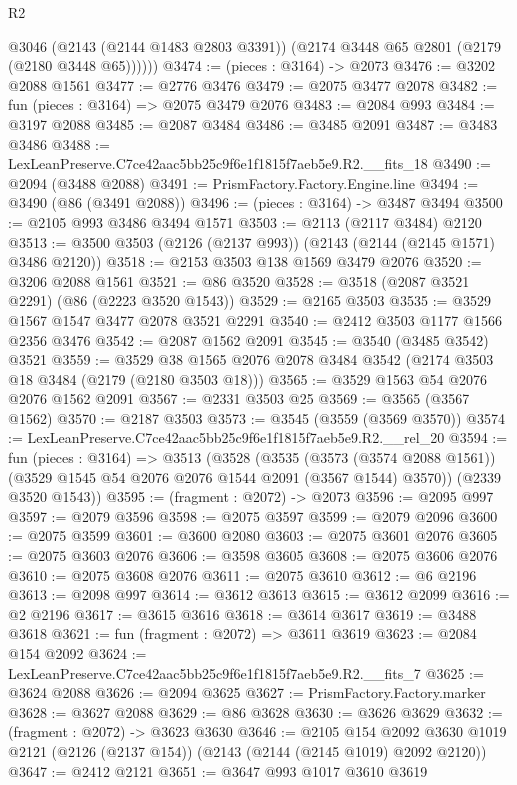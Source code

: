 \begin{lexlean}{R2}
\begin{coremodule}
          @3046
          (@2143 (@2144 @1483 @2803 @3391))
          (@2174 @3448 @65 @2801 (@2179 (@2180 @3448 @65))))))
@3474 := (pieces : @3164) -> @2073
@3476 := @3202 @2088 @1561
@3477 := @2776 @3476
@3479 := @2075 @3477 @2078
@3482 := fun (pieces : @3164) => @2075 @3479 @2076
@3483 := @2084 @993
@3484 := @3197 @2088
@3485 := @2087 @3484
@3486 := @3485 @2091
@3487 := @3483 @3486
@3488 := LexLeanPreserve.C7ce42aac5bb25c9f6e1f1815f7aeb5e9.R2.__fits_18
@3490 := @2094 (@3488 @2088)
@3491 := PrismFactory.Factory.Engine.line
@3494 := @3490 (@86 (@3491 @2088))
@3496 := (pieces : @3164) -> @3487 @3494
@3500 := @2105 @993 @3486 @3494 @1571
@3503 := @2113 (@2117 @3484) @2120
@3513 := @3500 @3503 (@2126 (@2137 @993)) (@2143 (@2144 (@2145 @1571) @3486 @2120))
@3518 := @2153 @3503 @138 @1569 @3479 @2076
@3520 := @3206 @2088 @1561
@3521 := @86 @3520
@3528 := @3518 (@2087 @3521 @2291) (@86 (@2223 @3520 @1543))
@3529 := @2165 @3503
@3535 := @3529 @1567 @1547 @3477 @2078 @3521 @2291
@3540 := @2412 @3503 @1177 @1566 @2356 @3476
@3542 := @2087 @1562 @2091
@3545 := @3540 (@3485 @3542) @3521
@3559 := @3529 @38 @1565 @2076 @2078 @3484 @3542 (@2174 @3503 @18 @3484 (@2179 (@2180 @3503 @18)))
@3565 := @3529 @1563 @54 @2076 @2076 @1562 @2091
@3567 := @2331 @3503 @25
@3569 := @3565 (@3567 @1562)
@3570 := @2187 @3503
@3573 := @3545 (@3559 (@3569 @3570))
@3574 := LexLeanPreserve.C7ce42aac5bb25c9f6e1f1815f7aeb5e9.R2.__rel_20
@3594 := fun (pieces : @3164) =>
  @3513
    (@3528
      (@3535
        (@3573 (@3574 @2088 @1561))
        (@3529 @1545 @54 @2076 @2076 @1544 @2091 (@3567 @1544) @3570))
      (@2339 @3520 @1543))
@3595 := (fragment : @2072) -> @2073
@3596 := @2095 @997
@3597 := @2079 @3596
@3598 := @2075 @3597
@3599 := @2079 @2096
@3600 := @2075 @3599
@3601 := @3600 @2080
@3603 := @2075 @3601 @2076
@3605 := @2075 @3603 @2076
@3606 := @3598 @3605
@3608 := @2075 @3606 @2076
@3610 := @2075 @3608 @2076
@3611 := @2075 @3610
@3612 := @6 @2196
@3613 := @2098 @997
@3614 := @3612 @3613
@3615 := @3612 @2099
@3616 := @2 @2196
@3617 := @3615 @3616
@3618 := @3614 @3617
@3619 := @3488 @3618
@3621 := fun (fragment : @2072) => @3611 @3619
@3623 := @2084 @154 @2092
@3624 := LexLeanPreserve.C7ce42aac5bb25c9f6e1f1815f7aeb5e9.R2.__fits_7
@3625 := @3624 @2088
@3626 := @2094 @3625
@3627 := PrismFactory.Factory.marker
@3628 := @3627 @2088
@3629 := @86 @3628
@3630 := @3626 @3629
@3632 := (fragment : @2072) -> @3623 @3630
@3646 := @2105
    @154
    @2092
    @3630
    @1019
    @2121
    (@2126 (@2137 @154))
    (@2143 (@2144 (@2145 @1019) @2092 @2120))
@3647 := @2412 @2121
@3651 := @3647 @993 @1017 @3610 @3619

\end{coremodule}
\end{lexlean}
